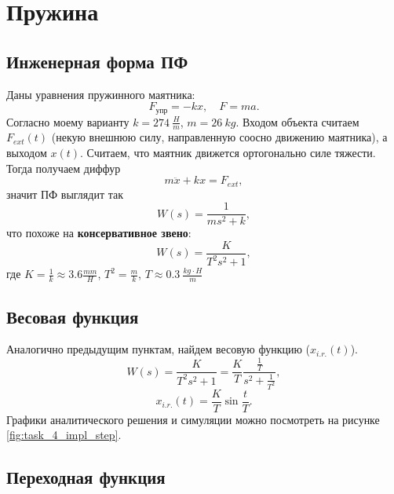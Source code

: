 \newpage
\section{Пружина}

\subsection{Инженерная форма ПФ}

Даны уравнения пружинного маятника:
\begin{equation*}
    F_\text{упр}=-kx,\quad F=ma.
\end{equation*}
Согласно моему варианту $k=274\ \frac{H}{m}$, $m=26\ kg$. Входом объекта 
считаем $F_{ext}(t)$ (некую внешнюю силу, направленную соосно движению маятника), 
а выходом $x(t)$. Считаем, что маятник движется ортогонально силе тяжести.
Тогда получаем диффур
\begin{equation*}
    m\ddot x+kx=F_{ext},
\end{equation*}
значит ПФ выглядит так
\begin{equation*}
    W(s)=\frac{1}{ms^2+k},
\end{equation*}
что похоже на \textbf{консервативное звено}:
\begin{equation*}
    W(s)=\frac{K}{T^2s^2+1},
\end{equation*}
где $K=\frac{1}{k}\approx 3.6 \frac{mm}{H}$, $T^2=\frac{m}{k}$, $T\approx 0.3\ \frac{kg\cdot H}{m}$

\subsection{Весовая функция}

Аналогично предыдущим пунктам, найдем весовую функцию ($x_{i.r.}(t)$).
\begin{equation*}
    W(s)=\frac{K}{T^2s^2+1}=\frac{K}{T}\frac{\frac{1}{T}}{s^2+\frac{1}{T^2}},
\end{equation*}
\begin{equation*}
    x_{i.r.}(t)=\frac{K}{T}\sin \frac{t}{T}.
\end{equation*}
Графики аналитического решения и симуляции можно посмотреть на рисунке \ref{fig:task_4_impl_step}.

\subsection{Переходная функция}

